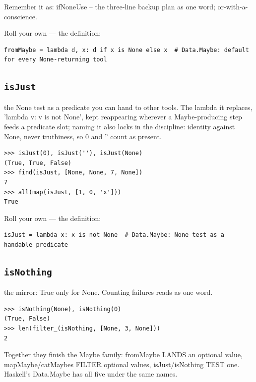 \documentclass[10pt,letterpaper]{book}
\begin{document}
Remember it as: ifNoneUse -- the three-line backup plan as one word; or-with-a-conscience.


Roll your own --- the definition:

\begin{lstlisting}[style=ex]
fromMaybe = lambda d, x: d if x is None else x  # Data.Maybe: default for every None-returning tool
\end{lstlisting}

\subsection{\texttt{isJust}}\label{def:isJust}
the None test as a predicate you can hand to other tools. The lambda it replaces, 'lambda v: v is not None', kept reappearing wherever a Maybe-producing step feeds a predicate slot; naming it also locks in the discipline: identity against None, never truthiness, so 0 and '' count as present.
\begin{lstlisting}[style=ex]
>>> isJust(0), isJust(''), isJust(None)
(True, True, False)
>>> find(isJust, [None, None, 7, None])
7
>>> all(map(isJust, [1, 0, 'x']))
True
\end{lstlisting}

Roll your own --- the definition:

\begin{lstlisting}[style=ex]
isJust = lambda x: x is not None  # Data.Maybe: None test as a handable predicate
\end{lstlisting}

\subsection{\texttt{isNothing}}\label{def:isNothing}
the mirror: True only for None. Counting failures reads as one word.
\begin{lstlisting}[style=ex]
>>> isNothing(None), isNothing(0)
(True, False)
>>> len(filter_(isNothing, [None, 3, None]))
2
\end{lstlisting}

Together they finish the Maybe family: fromMaybe LANDS an optional value, mapMaybe/catMaybes FILTER optional values, isJust/isNothing TEST one. Haskell's Data.Maybe has all five under the same names.
\end{document}
